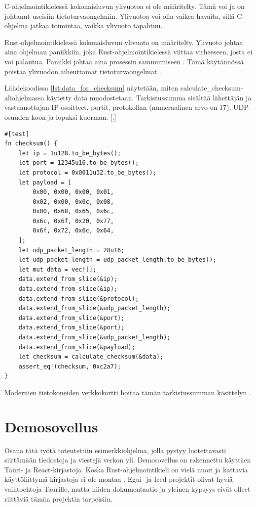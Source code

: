\documentclass[a4paper,12pt]{article}
\begin{document}
    C-ohjelmointikielessä kokonaisluvun ylivuotoa ei ole määritelty. Tämä voi ja on johtanut useisiin tietoturvaongelmiin. Ylivuotoa voi olla vaikea havaita, sillä C-ohjelma jatkaa toimintaa, vaikka ylivuoto tapahtuu.\par
    Rust-ohjelmointikielessä kokonaisluvun ylivuoto on määritelty. Ylivuoto johtaa aina ohjelman paniikkiin, joka Rust-ohjelmointikielessä viittaa virheeseen, josta ei voi palautua. Paniikki johtaa aina prosessin sammumiseen \cite[luku 9.3]{rust-book}. Tämä käytännössä poistaa ylivuodon aiheuttamat tietoturvaongelmat \cite[luku 3.2]{rust-book}.

    Lähdekoodissa \ref{lst:data_for_checksum} näytetään, miten calculate\_checksum-aliohjelmassa käytetty data muodostetaan. Tarkistussumma sisältää lähettäjän ja vastaanottajan IP-osoitteet, portit, protokollan (numeraalinen arvo on 17), UDP-osuuden koon ja lopuksi kuorman. [.] \par

\newpage

        \begin{lstlisting}[caption={Tietojen kasaaminen tarkistussummaa varten.}, label={lst:data_for_checksum}]
#[test]
fn checksum() {
    let ip = 1u128.to_be_bytes();
    let port = 12345u16.to_be_bytes();
    let protocol = 0x0011u32.to_be_bytes();
    let payload = [
        0x00, 0x00, 0x00, 0x01,
        0x02, 0x00, 0x0c, 0x08,
        0x00, 0x68, 0x65, 0x6c,
        0x6c, 0x6f, 0x20, 0x77,
        0x6f, 0x72, 0x6c, 0x64,
    ];
    let udp_packet_length = 28u16;
    let udp_packet_length = udp_packet_length.to_be_bytes();
    let mut data = vec![];
    data.extend_from_slice(&ip);
    data.extend_from_slice(&ip);
    data.extend_from_slice(&protocol);
    data.extend_from_slice(&udp_packet_length);
    data.extend_from_slice(&port);
    data.extend_from_slice(&port);
    data.extend_from_slice(&udp_packet_length);
    data.extend_from_slice(&payload);
    let checksum = calculate_checksum(&data);
    assert_eq!(checksum, 0xc2a7);
}\end{lstlisting}

    Modernien tietokoneiden verkkokortti hoitaa tämän tarkistussumman käsittelyn \cite{VivianoTCP/IPOverview}.


    \section{Demosovellus}\label{sec:demo}

    Osana tätä työtä toteutettiin esimerkkiohjelma, jolla pystyy luotettavasti siirtämään tiedostoja ja viestejä verkon yli. Demosovellus on rakennettu käyttäen Tauri- ja React-kirjastoja. Koska Rust-ohjelmointikieli on vielä nuori ja kattavia käyttöliittymä kirjastoja ei ole montaa \cite{AreYet}. 
    Egui- ja Iced-projektit olivat hyviä vaihtoehtoja Taurille, mutta niiden dokumentaatio ja yleinen kypsyys eivät olleet riittäviä tämän projektin tarpeisiin. \par
\end{document}
